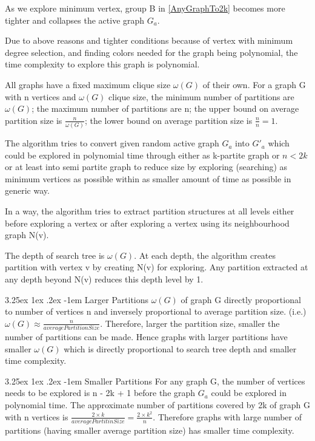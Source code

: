 \documentclass[12pt]{article}
\makeatletter
\theoremstyle{plain}
\theoremstyle{definition}
\newcounter{subsubsubsection}[subsubsection]
\renewcommand\paragraph{\@startsection{paragraph}{5}{\z@}%
	{3.25ex \@plus1ex \@minus.2ex}%
	{-1em}%
	{\normalfont\normalsize\bfseries}}
\makeatother
\begin{document}
As we explore minimum vertex, group B in \ref{AnyGraphTo2k} becomes more tighter and collapses the active graph $G_a$.

Due to above reasons and tighter conditions because of vertex with minimum degree selection, and finding colors needed for the graph being polynomial, the time complexity to explore this graph is polynomial. 

All graphs have a fixed maximum clique size $\omega(G)$ of their own. For a graph G with n vertices and $\omega(G)$ clique size, the minimum number of partitions are $\omega(G)$; the maximum number of partitions are n; the upper bound on average partition size is $\frac{n}{\omega(G)}$; the lower bound on average partition size is $\frac{n}{n} = 1$.

The algorithm tries to convert given random active graph $G_a$ into $G'_a$ which could be explored in polynomial time through either as k-partite graph or $n < 2k$ or at least into semi partite graph to reduce size by exploring (searching) as minimum vertices as possible within as smaller amount of time as possible in generic way.

In a way, the algorithm tries to extract partition structures at all levels either before exploring a vertex or after exploring a vertex using its neighbourhood graph N(v).

The depth of search tree is $\omega(G)$. At each depth, the algorithm creates partition with vertex v by creating N(v) for exploring. Any partition extracted at any depth beyond N(v) reduces this depth level by 1.

\paragraph{Larger Partitions}
$\omega(G)$ of graph G directly proportional to number of vertices n and inversely proportional to average partition size. (i.e.) $\omega(G) \approx \frac{n}{averagePartitionSize}$. Therefore, larger the partition size, smaller the number of partitions can be made. Hence graphs with larger partitions have smaller $\omega(G)$ which is directly proportional to search tree depth and smaller time complexity.

\paragraph{Smaller Partitions}
For any graph G, the number of vertices needs to be explored is n - 2k + 1 before the graph $G_a$ could be explored in polynomial time. The approximate number of partitions covered by 2k of graph G with n vertices is $\frac{2 \times k}{averagePartitinSize} = \frac{2 \times k^2}{n}$. Therefore graphs with large number of partitions (having smaller average partition size) has smaller time complexity.
\end{document}
